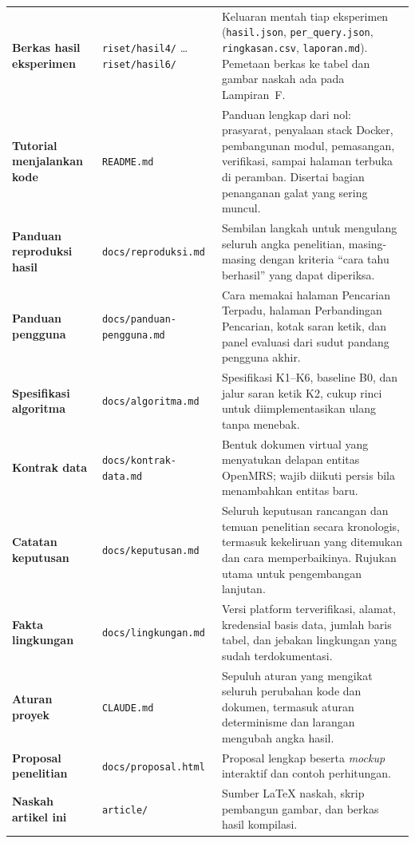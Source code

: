 \begin{longtable}{@{}p{}p{}p{}@{}}
\textbf{Berkas hasil eksperimen} &
\texttt{riset/hasil4/} \dots \texttt{riset/hasil6/} &
Keluaran mentah tiap eksperimen (\texttt{hasil.json},
\texttt{per\_query.json}, \texttt{ringkasan.csv}, \texttt{laporan.md}).
Pemetaan berkas ke tabel dan gambar naskah ada pada Lampiran~F. \\

\textbf{Tutorial menjalankan kode} &
\texttt{README.md} &
Panduan lengkap dari nol: prasyarat, penyalaan stack Docker, pembangunan
modul, pemasangan, verifikasi, sampai halaman terbuka di peramban. Disertai
bagian penanganan galat yang sering muncul. \\

\textbf{Panduan reproduksi hasil} &
\texttt{docs/reproduksi.md} &
Sembilan langkah untuk mengulang seluruh angka penelitian, masing-masing
dengan kriteria ``cara tahu berhasil'' yang dapat diperiksa. \\

\textbf{Panduan pengguna} &
\texttt{docs/panduan-pengguna.md} &
Cara memakai halaman Pencarian Terpadu, halaman Perbandingan Pencarian,
kotak saran ketik, dan panel evaluasi dari sudut pandang pengguna akhir. \\

\textbf{Spesifikasi algoritma} &
\texttt{docs/algoritma.md} &
Spesifikasi K1--K6, baseline B0, dan jalur saran ketik K2, cukup rinci untuk
diimplementasikan ulang tanpa menebak. \\

\textbf{Kontrak data} &
\texttt{docs/kontrak-data.md} &
Bentuk dokumen virtual yang menyatukan delapan entitas OpenMRS; wajib diikuti
persis bila menambahkan entitas baru. \\

\textbf{Catatan keputusan} &
\texttt{docs/keputusan.md} &
Seluruh keputusan rancangan dan temuan penelitian secara kronologis, termasuk
kekeliruan yang ditemukan dan cara memperbaikinya. Rujukan utama untuk
pengembangan lanjutan. \\

\textbf{Fakta lingkungan} &
\texttt{docs/lingkungan.md} &
Versi platform terverifikasi, alamat, kredensial basis data, jumlah baris
tabel, dan jebakan lingkungan yang sudah terdokumentasi. \\

\textbf{Aturan proyek} &
\texttt{CLAUDE.md} &
Sepuluh aturan yang mengikat seluruh perubahan kode dan dokumen, termasuk
aturan determinisme dan larangan mengubah angka hasil. \\

\textbf{Proposal penelitian} &
\texttt{docs/proposal.html} &
Proposal lengkap beserta \emph{mockup} interaktif dan contoh perhitungan. \\

\textbf{Naskah artikel ini} &
\texttt{article/} &
Sumber \LaTeX{} naskah, skrip pembangun gambar, dan berkas hasil kompilasi. \\

\end{longtable}


